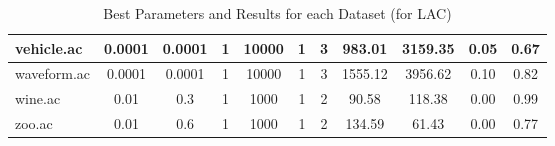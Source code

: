 \begin{table}[htbp]
\begin{tabular}{|l|c|c|c|c|c|c||c|c|c|c|}
		\hline
		vehicle.ac     & 0.0001   & 0.0001      & 1              & 10000               & 1             & 3             & 983.01         & 3159.35        & 0.05           & 0.67           \\
		\hline
		waveform.ac    & 0.0001   & 0.0001      & 1              & 10000               & 1             & 3             & 1555.12        & 3956.62        & 0.10           & 0.82           \\
		\hline
		wine.ac        & 0.01     & 0.3         & 1              & 1000                & 1             & 2             & 90.58          & 118.38         & 0.00           & 0.99           \\
		\hline
		zoo.ac         & 0.01     & 0.6         & 1              & 1000                & 1             & 2             & 134.59         & 61.43          & 0.00           & 0.77           \\
		\hline
		\end{tabular}
	\caption{Best Parameters and Results for each Dataset (for LAC)}
	\label{tab:best_runs_for_each_db_lac}
\end{table}